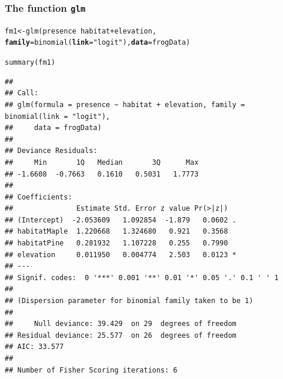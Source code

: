 \documentclass[color=usenames,dvipsnames]{beamer}\usepackage[]{graphicx}\usepackage[]{color}
\makeatletter
\newcommand{\hlstr}[1]{\textcolor[rgb]{0.749,0.012,0.012}{#1}}%
\newcommand{\hlopt}[1]{\textcolor[rgb]{0,0,0}{#1}}%
\newcommand{\hlstd}[1]{\textcolor[rgb]{0,0,0}{#1}}%
\newcommand{\hlkwb}[1]{\textcolor[rgb]{0,0.341,0.682}{#1}}%
\newcommand{\hlkwc}[1]{\textcolor[rgb]{0,0,0}{\textbf{#1}}}%
\newcommand{\hlkwd}[1]{\textcolor[rgb]{0.004,0.004,0.506}{#1}}%
\newenvironment{kframe}{%
 \def\at@end@of@kframe{}%
 \ifinner\ifhmode%
  \def\at@end@of@kframe{\end{minipage}}%
  \begin{minipage}{\columnwidth}%
 \fi\fi%
 \def\FrameCommand##1{\hskip\@totalleftmargin \hskip-\fboxsep
 \colorbox{shadecolor}{##1}\hskip-\fboxsep
     \hskip-\linewidth \hskip-\@totalleftmargin \hskip\columnwidth}%
 \MakeFramed {\advance\hsize-\width
   \@totalleftmargin\z@ \linewidth\hsize
   \@setminipage}}%
 {\par\unskip\endMakeFramed%
 \at@end@of@kframe}
\newenvironment{knitrout}{}{} %
\makeatother
\begin{document}
\begin{frame}[fragile]
  \frametitle{The function {\tt glm}}
  \footnotesize
\begin{knitrout}\tiny
{}\color{fgcolor}\begin{kframe}
\begin{alltt}
\hlstd{fm1} \hlkwb{<-} \hlkwd{glm}\hlstd{(presence} \hlopt{~} \hlstd{habitat} \hlopt{+} \hlstd{elevation,}
           \hlkwc{family}\hlstd{=}\hlkwd{binomial}\hlstd{(}\hlkwc{link}\hlstd{=}\hlstr{"logit"}\hlstd{),} \hlkwc{data}\hlstd{=frogData)}
\end{alltt}
\end{kframe}
\end{knitrout}
\pause
\begin{knitrout}\tiny
{}\color{fgcolor}\begin{kframe}
\begin{alltt}
\hlkwd{summary}\hlstd{(fm1)}
\end{alltt}
\begin{verbatim}
## 
## Call:
## glm(formula = presence ~ habitat + elevation, family = binomial(link = "logit"), 
##     data = frogData)
## 
## Deviance Residuals: 
##     Min       1Q   Median       3Q      Max  
## -1.6608  -0.7663   0.1610   0.5031   1.7773  
## 
## Coefficients:
##               Estimate Std. Error z value Pr(>|z|)  
## (Intercept)  -2.053609   1.092854  -1.879   0.0602 .
## habitatMaple  1.220668   1.324680   0.921   0.3568  
## habitatPine   0.281932   1.107228   0.255   0.7990  
## elevation     0.011950   0.004774   2.503   0.0123 *
## ---
## Signif. codes:  0 '***' 0.001 '**' 0.01 '*' 0.05 '.' 0.1 ' ' 1
## 
## (Dispersion parameter for binomial family taken to be 1)
## 
##     Null deviance: 39.429  on 29  degrees of freedom
## Residual deviance: 25.577  on 26  degrees of freedom
## AIC: 33.577
## 
## Number of Fisher Scoring iterations: 6
\end{verbatim}
\end{kframe}
\end{knitrout}
\end{frame}


\end{document}
